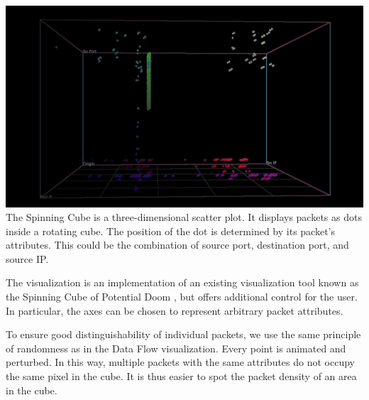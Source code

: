 \includegraphics[width=\linewidth]{materials/cube.jpg}
The Spinning Cube is a three-dimensional scatter plot. It displays packets as dots inside a rotating cube. The position of the dot is determined by its packet's attributes. This could be the combination of source port, destination port, and source IP. 

The visualization is an implementation of an existing visualization tool known as the Spinning Cube of Potential Doom \cite{lau2004spinning}, but offers additional control for the user. In particular, the axes can be chosen to represent arbitrary packet attributes.

To ensure good distinguishability of individual packets, we use the same principle of randomness as in the Data Flow visualization. Every point is animated and perturbed. In this way, multiple packets with the same attributes do not occupy the same pixel in the cube. It is thus easier to spot the packet density of an area in the cube.